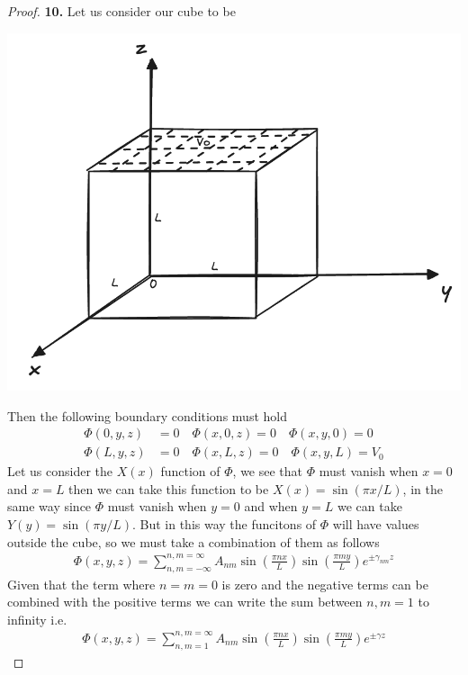 \documentclass[11pt]{article}
\theoremstyle{definition}
\begin{document}
\cleardoublepage
\begin{proof}{\textbf{10.}}
Let us consider our cube to be
\begin{center}
    \includegraphics[scale=0.3]{ch3-10.png}
\end{center}
Then the following boundary conditions must hold
\begin{align*}
    \Phi(0, y, z) &= 0 \quad \Phi(x, 0, z) = 0 \quad \Phi(x, y, 0) = 0\\
    \Phi(L, y, z) &= 0 \quad \Phi(x, L, z) = 0 \quad \Phi(x, y, L) = V_0
\end{align*}
Let us consider the $X(x)$ function of $\Phi$, we see that $\Phi$ must vanish
when $x = 0$ and $x = L$ then we can take this function to be
$X(x) = \sin(\pi x/L)$, in the same way since $\Phi$ must vanish when $y=0$
and when $y = L$ we can take $Y(y) = \sin(\pi y/L)$. But in this way the
funcitons of $\Phi$ will have values outside the cube, so we must take a
combination of them as follows
\begin{align*}
    \Phi(x,y,z) = \sum_{n,m=-\infty}^{n,m=\infty}
    A_{nm}\sin(\frac{\pi n x}{L}) \sin(\frac{\pi m y}{L})e^{\pm\gamma_{nm} z}
\end{align*}
Given that the term where $n = m = 0$ is zero and the negative terms can be
combined with the positive terms we can write the sum between $n, m = 1$ to
infinity i.e.
\begin{align*}
    \Phi(x,y,z) = \sum_{n,m=1}^{n,m=\infty}
    A_{nm}\sin(\frac{\pi n x}{L}) \sin(\frac{\pi m y}{L})e^{\pm\gamma z}
\end{align*}

\end{proof}
\end{document}
